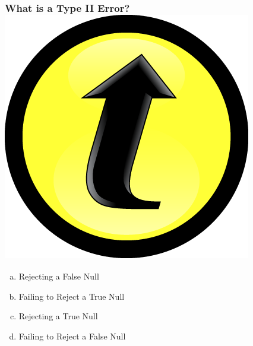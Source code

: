 \documentclass[handout]{beamer}
\begin{document}
\begin{frame}
\frametitle{What is a Type II Error? \includegraphics[scale = 0.05]{./images/clicker}}

\begin{enumerate}[(a)]
	\item Rejecting a False Null
	\item Failing to Reject a True Null
	\item Rejecting a True Null
	\item Failing to Reject a False Null
\end{enumerate}

\end{frame}



\end{document}
